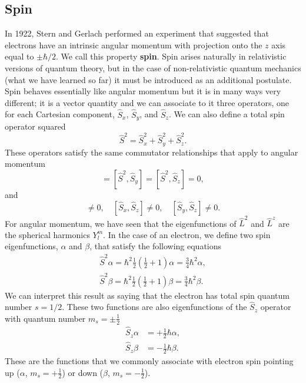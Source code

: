 \documentclass[../Main/chem331-notes.tex]{subfiles}
\begin{document}
\subsection{Spin}
In 1922, Stern and Gerlach performed an experiment that suggested that electrons have an intrinsic angular momentum with projection onto the $z$ axis equal to $\pm \hbar/2$.
We call this property \textbf{spin}.
Spin arises naturally in relativistic versions of quantum theory, but in the case of non-relativistic quantum mechanics (what we have learned so far) it must be introduced as an additional postulate.
Spin behaves essentially like angular momentum but it is in many ways very different; it is a vector quantity and we can associate to it three operators, one for each Cartesian component, $\hat{S}_x$, $\hat{S}_y$, and $\hat{S}_z$.
We can also define a total spin operator squared
\begin{equation}
\hat{S}^2 = \hat{S}_x^2 + \hat{S}_y^2 + \hat{S}_z^2.
\end{equation}
These operators satisfy the same commutator relationships that apply to angular momentum
\begin{equation}
[\hat{S}^2,\hat{S}_x] = [\hat{S}^2,\hat{S}_y] = [\hat{S}^2,\hat{S}_z] = 0,
\end{equation}
and
\begin{equation}
[\hat{S}_x,\hat{S}_y] \neq 0, \quad [\hat{S}_x,\hat{S}_z] \neq 0, \quad [\hat{S}_y,\hat{S}_z] \neq 0.
\end{equation}
For angular momentum, we have seen that the eigenfunctions of $\hat{L}^2$ and $\hat{L}^z$ are the spherical harmonics $Y_l^m$.
In the case of an electron, we define two spin eigenfunctions, $\alpha$ and $\beta$, that satisfy the following equations
\begin{align}
\hat{S}^2 \alpha = \hbar^2 \frac{1}{2} \left( \frac{1}{2} + 1\right) \alpha = \frac{3}{4} \hbar^2 \alpha,\\
\hat{S}^2 \beta = \hbar^2 \frac{1}{2} \left( \frac{1}{2} + 1\right) \beta = \frac{3}{4} \hbar^2 \beta.
\end{align}
We can interpret this result as saying that the electron has total spin quantum number $s = 1/2$.
These two functions are also eigenfunctions of the $\hat{S}_z$ operator with quantum number $m_s = \pm\frac{1}{2}$
\begin{align}
\hat{S}_z \alpha & = +\frac{1}{2} \hbar \alpha,\\
\hat{S}_z \beta & = - \frac{1}{2} \hbar \beta.
\end{align}
These are the functions that we commonly associate with electron spin pointing up ($\alpha$,  $m_s = +\frac{1}{2}$) or down ($\beta$,  $m_s = -\frac{1}{2}$).
\end{document}
